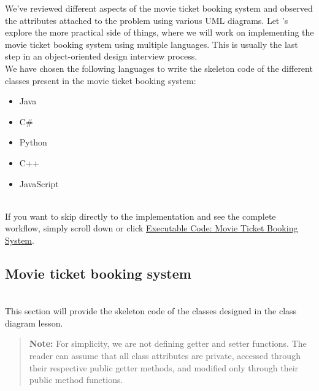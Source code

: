 

We've reviewed different aspects of the movie ticket booking system and observed the attributes attached to the problem using various UML diagrams. Let 's explore the more practical side of things, where we will work on implementing the movie ticket booking system using multiple languages. This is usually the last step in an object-oriented design interview process.
\\
We have chosen the following languages to write the skeleton code of the different classes present in the movie ticket booking system:

\begin{itemize}
\item
\protect{}\label{0UBDsZ1hgOUT7y7mcOZ74}
Java
\item
\protect{}\label{uOC8oTmr5vKPwNLRA84DA}
C\#
\item
\protect{}\label{MahD9kSXlplqbaSFRVTFA}
Python
\item
\protect{}\label{-WfF88eepOApGpgAwpr1f}
C++
\item
\protect{}\label{MMe733sMf97BZM7a4dKQn}
JavaScript
\end{itemize}
\\
If you want to skip directly to the implementation and see the complete workflow, simply scroll down or click \hyperref[Executable-code-Movie-ticket-booking-system]{Executable Code: Movie Ticket Booking System}.

\subsection{Movie ticket booking system}\label{hYliXh_7tsdrZZgr_VdjF}
\\
This section will provide the skeleton code of the classes designed in the class diagram lesson.
\begin{quote}
\textbf{Note:} For simplicity, we are not defining getter and setter functions. The reader can assume that all class attributes are private, accessed through their respective public getter methods, and modified only through their public method functions.
\end{quote}
